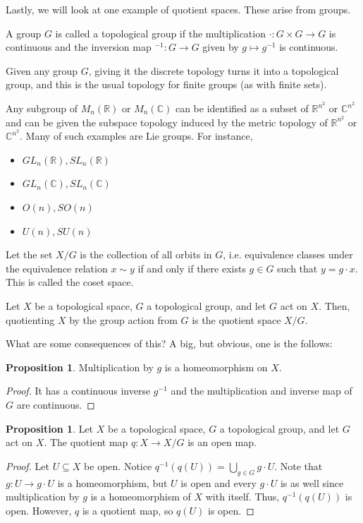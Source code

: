 \documentclass[12pt,reqno]{amsart}
\numberwithin{theorem}{section}
\theoremstyle{definition}
\theoremstyle{remark}
\numberwithin{equation}{section}
\newcommand{\C}{\mathbb C}
\theoremstyle{definition}
\newtheorem{prop}[theorem]{Proposition}
\newcommand{\R}{\mathbb{R}}
\begin{document}
Lastly, we will look at one example of quotient spaces. These arise from groups.
\begin{definition}
    A group $G$ is called a topological group if the multiplication $\cdot : G\times G\rightarrow G$ is continuous and the inversion map $^{-1}:G\rightarrow G$ given by $g \mapsto g^{-1}$ is continuous.
\end{definition}
\begin{example}
    Given any group $G$, giving it the discrete topology turns it into a topological group, and this is the usual topology for finite groups (as with finite sets).
\end{example}
\begin{example}\label{groupexample}
    Any subgroup of $M_n(\mathbb R)$ or $M_n(\mathbb C)$ can be identified as a subset of $\mathbb R^{n^2}$ or $\C^{n^2}$ and can be given the subspace topology induced by the metric topology of $\mathbb R^{n^2}$ or $\C^{n^2}$. Many of such examples are Lie groups. For instance,
    \begin{itemize}
        \item $GL_n(\R),SL_n(\R)$
        \item $GL_n(\C),SL_n(\C)$
        \item $O(n),SO(n)$
        \item $U(n),SU(n)$
    \end{itemize}
\end{example}
Let the set $X/G$ is the collection of all orbits in $G$, i.e. equivalence classes under the equivalence relation $x \sim y$ if and only if there exists $g \in G$ such that $y = g\cdot x$. This is called the coset space. 
\begin{definition}
    Let $X$ be a topological space, $G$ a topological group, and let $G$ act on $X$. Then, quotienting $X$ by the group action from $G$ is the quotient space $X/G$.
\end{definition}
What are some consequences of this? A big, but obvious, one is the follows:
\begin{prop}
    Multiplication by $g$ is a homeomorphism on $X$.
\end{prop}
\begin{proof}
    It has a continuous inverse $g^{-1}$ and the multiplication and inverse map of $G$ are continuous.
\end{proof}

\begin{prop}
    Let $X$ be a topological space, $G$ a topological group, and let $G$ act on $X$. The quotient map $q:X \rightarrow X/G$ is an open map.
\end{prop}
\begin{proof}
    Let $U\subseteq X$ be open. Notice $q^{-1}(q(U)) = \bigcup_{g \in G} g\cdot U $. Note that $g:U\rightarrow g\cdot U$ is a homeomorphism, but $U$ is open and every $g\cdot U$ is as well since multiplication by $g$ is a homeomorphism of $X$ with itself. Thus, $q^{-1}(q(U))$ is open. However, $q$ is a quotient map, so $q(U)$ is open.
\end{proof}
\end{document}
